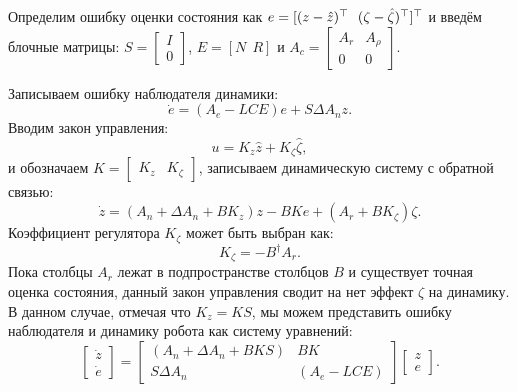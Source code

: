 Определим ошибку оценки состояния как $e = [ (z-\hat{z})^\top \ \ (\zeta-\hat{\zeta})^\top ]^\top$ и введём блочные матрицы:
${S} = \begin{bmatrix}
	{I} \\ 0
\end{bmatrix}$, 
${E}=[ {N} \ \ {R}]$ и 
$
{A}_c=    \begin{bmatrix}
	{A}_r  & {A}_{\rho} \\
	0  & 0
\end{bmatrix}.
$

Записываем ошибку наблюдателя динамики:
%
\begin{equation}
	\label{eq:part1_error_dynamics}
	\dot e= ({A}_e-{L}{C}{E})e +{S}\Delta {A}_n z.
\end{equation}
%
Вводим закон управления:
%
\begin{equation}
	u={K}_z \hat{z}+{K}_{\zeta} \hat{\zeta},
\end{equation}
%
и обозначаем ${K}=\begin{bmatrix}
	{K}_z & {K}_{\zeta}
\end{bmatrix}$, записываем динамическую систему с обратной связью:
%
\begin{equation}
	\label{eq:part1_active_dynamics}
	\dot{z}=({A}_n+\Delta {A}_n +{B}{K}_z)z-{B}{K}e+({A}_r+{B}{K}_{\zeta})\zeta.
\end{equation}
%
Коэффициент регулятора ${K}_{\zeta}$ может быть выбран как:
%
\begin{equation}
	\label{eq:part1_static_control}
	{K}_{\zeta}=-{B}^{\dagger}{A}_r.
\end{equation}
%
Пока столбцы ${A}_r$ лежат в подпространстве столбцов ${B}$ и существует точная оценка состояния, данный закон управления сводит на нет эффект $\zeta$ на динамику. В данном случае, отмечая что ${K}_z={K}{S}$,  мы можем представить ошибку наблюдателя и динамику робота как систему уравнений:
%
\begin{equation}
	\label{eq:part1_system}
	\begin{bmatrix}
		\dot{z} \\ \dot{e}
	\end{bmatrix}=\begin{bmatrix}
		({A}_n+\Delta {A}_n +{B}{K}{S}) & {B}{K} \\
		{S} \Delta {A}_n & ({A}_e-{L}{C}{E})        \end{bmatrix}\begin{bmatrix}
		z \\ e
	\end{bmatrix}.
\end{equation}

